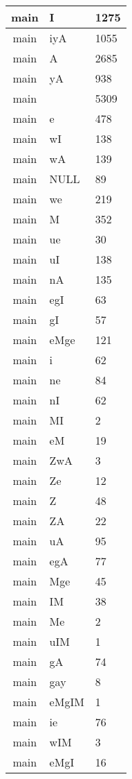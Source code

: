 \documentclass[a4 paper]{article}
\begin{document}
\begin{longtable}{cp{}p{}}
main & I & 1275\\ \midrule main & iyA & 1055\\ \midrule main & A & 2685\\ \midrule main & yA & 938\\ \midrule main &  & 5309\\ \midrule main & e & 478\\ \midrule main & wI & 138\\ \midrule main & wA & 139\\ \midrule main & NULL & 89\\ \midrule main & we & 219\\ \midrule main & M & 352\\ \midrule main & ue & 30\\ \midrule main & uI & 138\\ \midrule main & nA & 135\\ \midrule main & egI & 63\\ \midrule main & gI & 57\\ \midrule main & eMge & 121\\ \midrule main & i & 62\\ \midrule main & ne & 84\\ \midrule main & nI & 62\\ \midrule main & MI & 2\\ \midrule main & eM & 19\\ \midrule main & ZwA & 3\\ \midrule main & Ze & 12\\ \midrule main & Z & 48\\ \midrule main & ZA & 22\\ \midrule main & uA & 95\\ \midrule main & egA & 77\\ \midrule main & Mge & 45\\ \midrule main & IM & 38\\ \midrule main & Me & 2\\ \midrule main & uIM & 1\\ \midrule main & gA & 74\\ \midrule main & gay & 8\\ \midrule main & eMgIM & 1\\ \midrule main & ie & 76\\ \midrule main & wIM & 3\\ \midrule main & eMgI & 16\\ 
\end{longtable}
\end{document}
